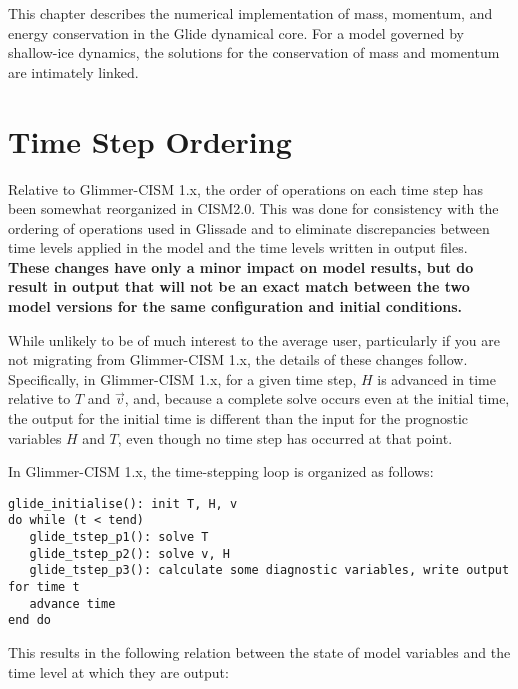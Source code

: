 \label{ch:glide}

This chapter describes the numerical implementation of mass, momentum, and energy conservation in the Glide dynamical core. For a model governed by shallow-ice dynamics, the solutions for the conservation of mass and momentum are intimately linked.








\section{Time Step Ordering}

Relative to Glimmer-CISM 1.x, the order of operations on each time step has been
somewhat reorganized in CISM2.0.  This was done for consistency with the ordering
of operations used in Glissade and to eliminate discrepancies between time levels
applied in the model and the time levels written in output files.  
\textbf{These changes have only a minor impact on model results, but do result 
in output that will not be an exact match between the two model versions for the
same configuration and initial conditions.}

While unlikely to be of much interest to the average user, particularly if you are not
migrating from Glimmer-CISM 1.x, the details of these changes follow.
Specifically, in Glimmer-CISM 1.x, for a given time step, $H$ is advanced in time
relative to $T$ and $\vec{v}$, and, because a complete solve occurs even at the 
initial time, the output for the initial time is different than the input for 
the prognostic variables $H$ and $T$, even though no time step has occurred at 
that point.

In Glimmer-CISM 1.x, the time-stepping loop is organized as follows:
\begin{verbatim}
glide_initialise(): init T, H, v
do while (t < tend)
   glide_tstep_p1(): solve T
   glide_tstep_p2(): solve v, H
   glide_tstep_p3(): calculate some diagnostic variables, write output for time t
   advance time
end do
\end{verbatim}

\noindent This results in the following relation between the state of model variables and
the time level at which they are output:

